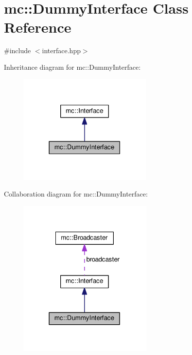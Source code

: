 \hypertarget{classmc_1_1DummyInterface}{}\section{mc\+:\+:Dummy\+Interface Class Reference}
\label{classmc_1_1DummyInterface}


{\ttfamily \#include $<$interface.\+hpp$>$}



Inheritance diagram for mc\+:\+:Dummy\+Interface\+:\nopagebreak
\begin{figure}[H]
\begin{center}
\leavevmode
\includegraphics[width=189pt]{classmc_1_1DummyInterface__inherit__graph}
\end{center}
\end{figure}


Collaboration diagram for mc\+:\+:Dummy\+Interface\+:\nopagebreak
\begin{figure}[H]
\begin{center}
\leavevmode
\includegraphics[width=190pt]{classmc_1_1DummyInterface__coll__graph}
\end{center}
\end{figure}
